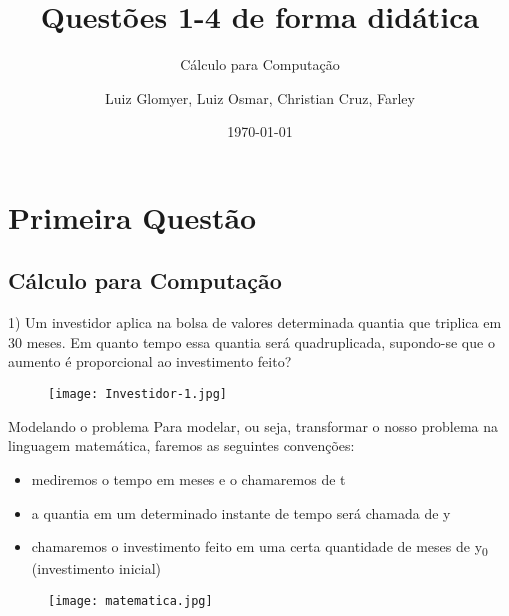 \documentclass{beamer}
\title{Questões 1-4 de forma didática}
\subtitle{Cálculo para Computação}
\author{Luiz Glomyer, Luiz Osmar, Christian Cruz, Farley}
\institute{Escola Superior de Tecnologia - UEA}
\date{\today}
\begin{document}
	\begin{frame}
		\titlepage
	\end{frame}
	
	\section{Primeira Questão}
	\subsection{Cálculo para Computação}
	\begin{frame}
		1) Um investidor aplica na bolsa de valores determinada quantia que triplica em 30 meses. Em quanto tempo essa quantia será quadruplicada, supondo-se que o aumento é proporcional ao investimento feito?
		
		\begin{figure}
			\centering
			\texttt{[image: Investidor-1.jpg]}
			\label{fig:investidor-1}
		\end{figure}
	\end{frame}

	\begin{frame}{Modelando o problema}
		Para modelar, ou seja, transformar o nosso problema na linguagem matemática, faremos as seguintes convenções:
		\newline
		\pause
		
		\begin{itemize}
			\item  mediremos o tempo em meses e o chamaremos de t
			\item a quantia em um determinado instante de tempo será chamada de y
			\item chamaremos o investimento feito em uma certa quantidade de meses de y\textsubscript{0} (investimento inicial)
		\end{itemize}
	
		\begin{figure}
			\centering
			\texttt{[image: matematica.jpg]}
			\label{}
		\end{figure}
	\end{frame}
\end{document}
